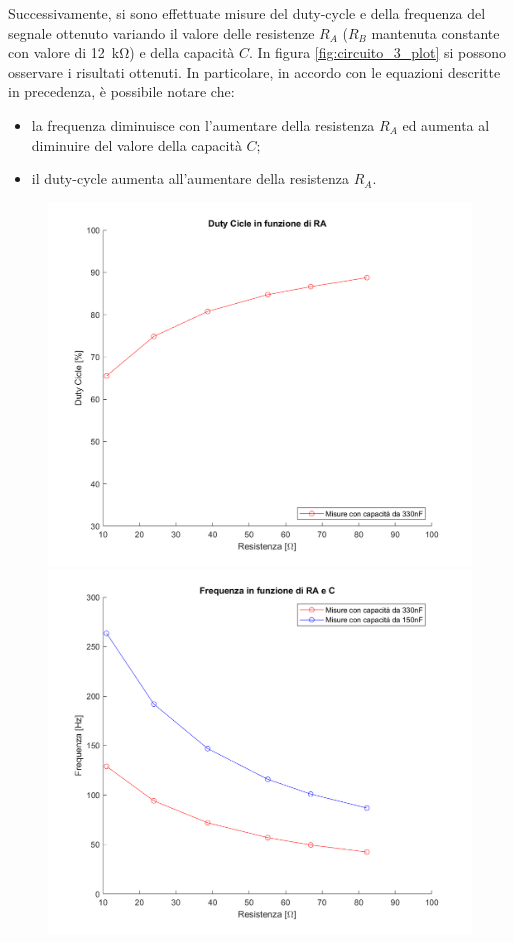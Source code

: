 \noindent
Successivamente, si sono effettuate misure del duty-cycle e della frequenza del segnale ottenuto variando il valore delle resistenze $R_A$ ($R_B$ mantenuta constante con valore di \SI{12}{\kilo\ohm}) e della capacità $C$. In figura \ref{fig:circuito_3_plot} si possono osservare i risultati ottenuti. In particolare, in accordo con le equazioni descritte in precedenza, è possibile notare che:
\begin{itemize}
	\item la frequenza diminuisce con l'aumentare della resistenza $R_A$ ed aumenta al diminuire del valore della capacità $C$;
	\item il duty-cycle aumenta all'aumentare della resistenza  $R_A$.
\end{itemize}
\begin{figure}[tbh]
	\centering
	\begin{minipage}{.496\textwidth}
		\includegraphics[width=\linewidth]{./ImageFiles/Laboratorio 5/Duty vs RA}
	\end{minipage}
	\begin{minipage}{.496\textwidth}
		\includegraphics[width=\linewidth]{./ImageFiles/Laboratorio 5/F vs RA}

\end{minipage}
\end{figure}
